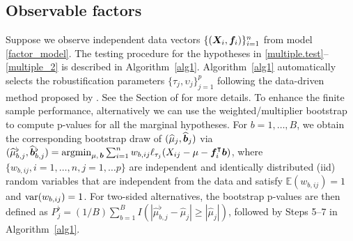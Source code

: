 \subsection{Observable factors}\label{sec:known_f}
Suppose we observe independent data vectors $\{ ( \bm{X}_i, \bm f_i ) \}_{i=1}^n$ from model \eqref{factor_model}. The testing procedure for the hypotheses in \eqref{multiple.test}--\eqref{multiple_2} is described in Algorithm~\ref{alg1}. Algorithm~\ref{alg1} automatically selects the robustification parameters $\{ \tau_j , \upsilon_j \}_{j=1}^p$ following the data-driven method proposed by \cite{KMRSZ2019}. See the Section of  for more details. To enhance the finite sample performance, alternatively we can use the weighted/multiplier bootstrap \citep{ZBFL2017,CZ2019} to compute p-values for all the marginal hypotheses. For $b=1,\ldots, B$, we obtain the corresponding bootstrap draw of $(\widehat \mu_j, \widehat {\bm{b}}_j)$ via $	(\widehat \mu^\flat_{b  , j} , \widehat{\bm{b}}^\flat_{b,j}) = \mathop{\mathrm{argmin}}_{\mu,  \, \bm{b} }  \sum_{i=1}^n w_{b,ij} \ell_{\tau_j}(X_{ij} - \mu - \bm f_i^\intercal \bm{b})$, where $\{ w_{b,ij} , i =1,\ldots, n, j=1,\ldots p \}$ are independent and identically distributed (iid) random variables that are independent from the data and satisfy $\mathbb{E}(w_{b,ij}) = 1$ and ${\rm var}(w_{b,ij})=1$. For two-sided alternatives, the bootstrap p-values  are then defined as $P^\flat_j= (1/B)\sum_{b=1}^B  I( | \hat \mu^\flat_{b,j} - \hat \mu_j  | \geq |\hat \mu_j |  )$, followed by Steps 5--7 in Algorithm~\ref{alg1}.




